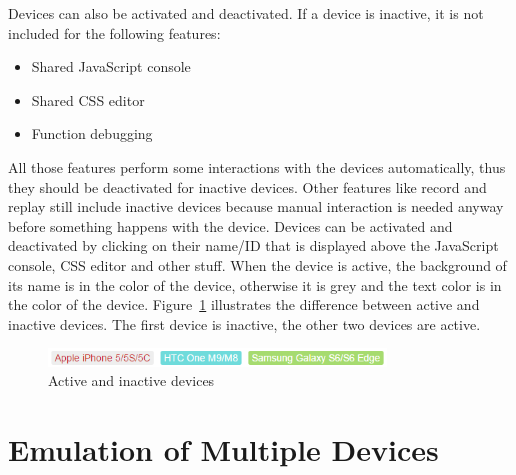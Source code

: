 Devices can also be activated and deactivated. If a device is inactive, it is not included for the following features:
\begin{itemize}
	\item Shared JavaScript console
	\item Shared CSS editor
	\item Function debugging
\end{itemize}
All those features perform some interactions with the devices automatically, thus they should be deactivated for inactive devices. Other features like record and replay still include inactive devices because manual interaction is needed anyway before something happens with the device. Devices can be activated and deactivated by clicking on their name/ID that is displayed above the JavaScript console, CSS editor and other stuff. When the device is active, the background of its name is in the color of the device, otherwise it is grey and the text color is in the color of the device. Figure~\ref{fig:active_inactive} illustrates the difference between active and inactive devices. The first device is inactive, the other two devices are active.

\begin{figure}[H]
  \centering
    \includegraphics[width=0.8\textwidth]{images/screenshots/active_inactive.png}
	\caption[Screenshot: Active/inactive devices]{Active and inactive devices}
	\label{fig:active_inactive}
\end{figure}

\section{Emulation of Multiple Devices}

